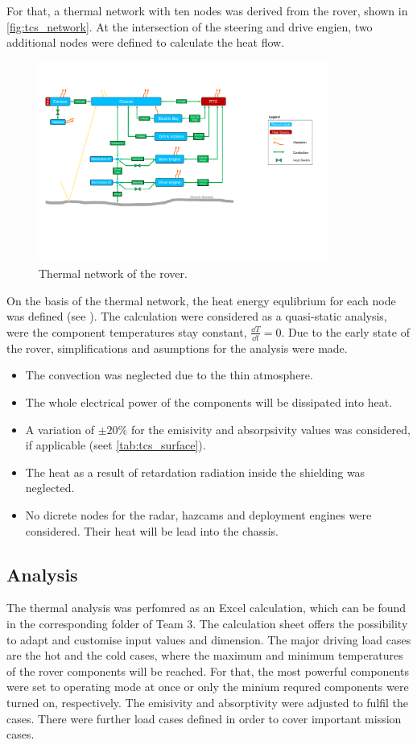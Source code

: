 For that, a thermal network with ten nodes was derived from the rover, shown in \autoref{fig:tcs_network}.
At the intersection of the steering and drive engien, two additional nodes were defined to calculate the heat flow.

\begin{figure}[H]
	\centering
	\includegraphics[width=0.85\textwidth]{Media/tcs_network}
	\caption{Thermal network of the rover.}
	\label{fig:tcs_network}
\end{figure}

On the basis of the thermal network, the heat energy equlibrium for each node was defined (see ).
The calculation were considered as a quasi-static analysis, were the component temperatures stay constant, $\frac{\dd T}{\dd t}=0$.
Due to the early state of the rover, simplifications and asumptions for the analysis were made.
\begin{itemize}
	\item The convection was neglected due to the thin atmosphere.
	\item The whole electrical power of the components will be dissipated into heat.
	\item A variation of $\pm 20\%$ for the emisivity and absorpsivity values was considered, if applicable (seet \autoref{tab:tcs_surface}).
	\item The heat as a result of retardation radiation inside the shielding was neglected.
	\item No dicrete nodes for the radar, hazcams and deployment engines were considered. Their heat will be lead into the chassis.
\end{itemize}


\subsection{Analysis}
The thermal analysis was perfomred as an Excel calculation, which can be found in the corresponding folder of Team 3.
The calculation sheet offers the possibility to adapt and customise input values and dimension.
The major driving load cases are the  hot and the cold cases, where the maximum and minimum temperatures of the rover components will be reached.
For that, the most powerful components were set to operating mode at once or only the minium requred components were turned on, respectively.
The emisivity and absorptivity were adjusted to fulfil the cases.
There were further load cases defined in order to cover important mission cases.

